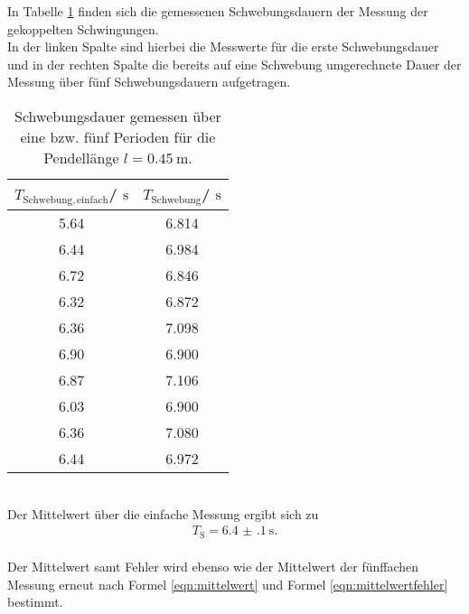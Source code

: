 In Tabelle \ref{tab:schwebung} finden sich die gemessenen Schwebungsdauern der Messung der gekoppelten Schwingungen.\\
In der linken Spalte sind hierbei die Messwerte für die erste Schwebungsdauer und in der rechten Spalte die bereits auf eine Schwebung umgerechnete Dauer der Messung über fünf Schwebungsdauern aufgetragen.
\begin{table}
	\centering
	\caption{Schwebungsdauer gemessen über eine bzw. fünf Perioden für die Pendellänge $l=\SI{0.45}{\meter}$.}
	\label{tab:schwebung}
	\begin{tabular}{cc}
		\toprule
		$T_{\mathrm{Schwebung, einfach}}$/ $\si{\second}$ & $T_{\mathrm{Schwebung}}$/ $\si{\second}$ \\
		\midrule
		5.64                                              & 6.814                                    \\
		6.44                                              & 6.984                                    \\
		6.72                                              & 6.846                                    \\
		6.32                                              & 6.872                                    \\
		6.36                                              & 7.098                                    \\
		6.90                                              & 6.900                                    \\
		6.87                                              & 7.106                                    \\
		6.03                                              & 6.900                                    \\
		6.36                                              & 7.080                                    \\
		6.44                                              & 6.972                                    \\
		\bottomrule
	\end{tabular}
\end{table}
\\Der Mittelwert über die einfache Messung ergibt sich zu
\begin{align*}
	T_{\mathrm{S}}=\SI{6.4(1)}{\second} \text{.}
\end{align*}
\\Der Mittelwert samt Fehler wird ebenso wie der Mittelwert der fünffachen Messung erneut nach Formel \eqref{eqn:mittelwert} und Formel \eqref{eqn:mittelwertfehler} bestimmt.
